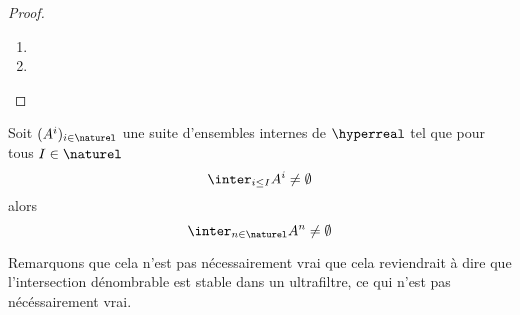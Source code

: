 \documentclass[a4paper, 12pt]{report}
\begin{document}
\ifdefined\outputproof
\begin{proof}
	\begin{enumerate}
		\item
		\item
	\end{enumerate}
\end{proof}
\fi

\begin{theorem} 
	\label{theorem:aleph_1_saturation}
	Soit $(A^{i})_{i \in \naturel}$ une suite d'ensembles internes de
	$\hyperreal$ tel que pour tous $I \in \naturel$
	\begin{equation}
		\inter_{i \leq I} A^{i} \neq \emptyset
	\end{equation}
	alors
	\begin{equation}
		\inter_{n \in \naturel} A^{n} \neq \emptyset
	\end{equation}
\end{theorem}

Remarquons que cela n'est pas nécessairement vrai que cela reviendrait à dire
que l'intersection dénombrable est stable dans un ultrafiltre, ce qui n'est pas
nécéssairement vrai.
\end{document}
